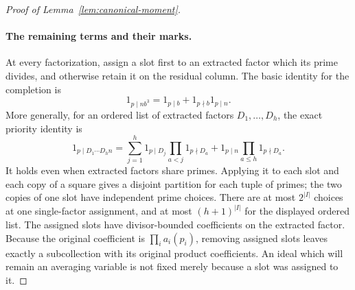 \documentclass[12pt]{article}
\begin{document}
\begin{proof}[Proof of Lemma~\ref{lem:canonical-moment}]
\paragraph{The remaining terms and their marks.}
At every factorization, assign a slot first to an extracted factor
which its prime divides, and otherwise retain it on the residual
column.  The basic identity for the completion is
\begin{equation}\label{old-eq:4.12}
 1_{p\mid nb^3}=1_{p\mid b}+1_{p\nmid b}1_{p\mid n}.
\end{equation}
More generally, for an ordered list of extracted factors
\(D_1,\ldots,D_h\), the exact priority identity is
\begin{equation}\label{eq:inverse-slot-priority}
 1_{p\mid D_1\cdots D_hn}
 =\sum_{j=1}^h1_{p\mid D_j}\prod_{a<j}1_{p\nmid D_a}
   +1_{p\mid n}\prod_{a\le h}1_{p\nmid D_a}.
\end{equation}
It holds even when extracted factors share primes.  Applying it to each
slot and each copy of a square gives a disjoint partition for each tuple
of primes; the two copies of one slot have independent prime choices.
There are at most \(2^{|I|}\) choices at one single-factor assignment,
and at most \((h+1)^{|I|}\) for the displayed ordered list.  The
assigned slots have divisor-bounded coefficients on the extracted
factor.  Because the original coefficient is
\(\prod_i a_i(p_i)\), removing assigned slots leaves exactly a
subcollection with its original product coefficients.  An ideal which
will remain an averaging variable is not fixed merely because a slot
was assigned to it.


\end{proof}
\end{document}
